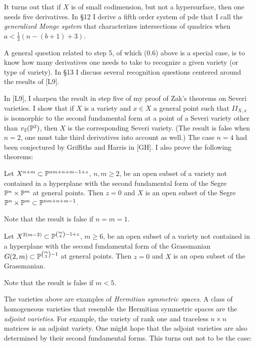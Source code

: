 It turns out that if $X$ is of small codimension, but not a hypersurface,
then one needs five derivatives. In \S 12 I derive a fifth order
system of pde that I call the {\it generalized Monge system} that
characterizes intersections of quadrics when $a<\frac 13(n-(b+1)+3)$.
 



 
A general question related to step 5, of which (0.6) above is
a special case, is to know how many derivatives one needs to take
to recognize a given variety (or type of variety). In \S 13 I discuss
several
recognition questions centered around the results of [L9].

In [L9], I sharpen the result in
step five of my   proof of Zak's theorems on Severi
varieties. I show that  
   if $X$ is a variety and  $ x \in X$ a general point such
that $II_{X,x}$ is isomorphic to the second fundamental form
at a point of a Severi variety other than $v_2(\Bbb P^{2})$, then $X$ is the
corresponding Severi variety. (The result
is false when $n=2$, one must take third derivatives into account as well.)
The
case
$n=4$ had been conjectured by Griffiths and Harris in [GH].
  I also prove the following theorems:
  
Let $X^{n+m}\subset\Bbb P^{nm+n+m-1+z}$,
$n,m\geq 2$, be an open subset of a variety   not contained
in a hyperplane with the second fundamental form of the
Segre $\Bbb P^{n}\times \Bbb P^{m}$ at   general points. Then $z=0$
and $X$ is an open
subset of the Segre $\Bbb P^{n}\times \Bbb P^{m}\subset\Bbb P^{nm+n+m-1}$.
\endproclaim

Note that the result is false if $n=m=1$.  

Let $X^{2(m-2)}\subset\Bbb P^{\binom m2
-1+z}$,
$m\geq 6$, be an open subset of a variety  not contained
in a hyperplane with the second fundamental form of the
Grassmanian $G(2,m)\subset\Bbb P^{\binom m2 -1}$ at   general points. Then
$z=0$
and $X$ is an open
subset of the Grassmanian.
\endproclaim

Note that the result is false if $m<5$.  

The varieties above are examples of {\it Hermitian symmetric spaces}.
A class of homogeneous varieties that resemble the Hermitian symmetric
spaces are the {\it adjoint varieties}. For example, the variety
of rank one  and traceless  $n\times n$ matrices  is an adjoint variety.
One might hope that the adjoint varieties are also determined by
their second fundamental forms. This turns out not to be the case:

